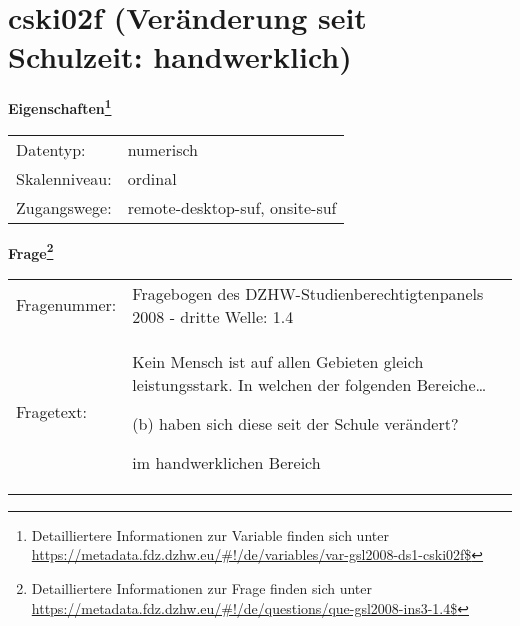 
    \setcounter{footnote}{0}

    \vspace*{-1.8cm}
	\section{cski02f (Veränderung seit Schulzeit: handwerklich)}
	\label{section:cski02f}



    \vspace*{0.5cm}
    \noindent\textbf{Eigenschaften\footnote{Detailliertere Informationen zur Variable finden sich unter
		\url{https://metadata.fdz.dzhw.eu/\#!/de/variables/var-gsl2008-ds1-cski02f$}}}\\
	\begin{tabularx}{\hsize}{@{}lX}
	Datentyp: & numerisch \\
	Skalenniveau: & ordinal \\
	Zugangswege: &
	  remote-desktop-suf, 
	  onsite-suf
 \\
    \end{tabularx}



				\vspace*{0.5cm}
                \noindent\textbf{Frage\footnote{Detailliertere Informationen zur Frage finden sich unter
		              \url{https://metadata.fdz.dzhw.eu/\#!/de/questions/que-gsl2008-ins3-1.4$}}}\\
				\begin{tabularx}{\hsize}{@{}lX}
					Fragenummer: &
					  Fragebogen des DZHW-Studienberechtigtenpanels 2008 - dritte Welle:
					  1.4
 \\
					Fragetext: & Kein Mensch ist auf allen Gebieten gleich leistungsstark. In welchen der folgenden Bereiche…\par  (b) haben sich diese seit der Schule verändert?\par  im handwerklichen Bereich \\
				\end{tabularx}





